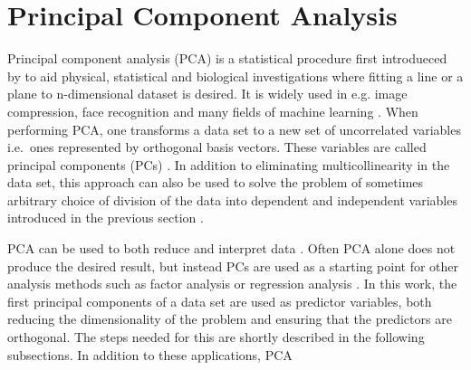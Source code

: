 \documentclass[english, oneside]{HYgradu}
\begin{document}
\section{Principal Component Analysis} \label{sect:pca}
Principal component analysis (PCA) is a statistical procedure first introdueced by \citet{pearson1901lines} to aid physical, statistical and biological investigations where fitting a line or a plane to n-dimensional dataset is desired. It is widely used in e.g. image compression, face recognition and many fields of machine learning \citep{smith2002tutorial, alpaydin2014introduction}. When performing PCA, one transforms a data set to a new set of uncorrelated variables i.e.\ ones represented by orthogonal basis vectors. These variables are called principal components (PCs) \citep{jolliffe2002principal}. In addition to eliminating multicollinearity in the data set, this approach can also be used to solve the problem of sometimes arbitrary choice of division of the data into dependent and independent variables introduced in the previous section \citep{pearson1901lines}. 

PCA can be used to both reduce and interpret data \citep{johnson2007applied}. Often PCA alone does not produce the desired result, but instead PCs are used as a starting point for other analysis methods such as factor analysis or regression analysis \citep{johnson2007applied}. In this work, the first principal components of a data set are used as predictor variables, both reducing the dimensionality of the problem and ensuring that the predictors are orthogonal. The steps needed for this are shortly described in the following subsections. In addition to  these applications, PCA 
\end{document}
